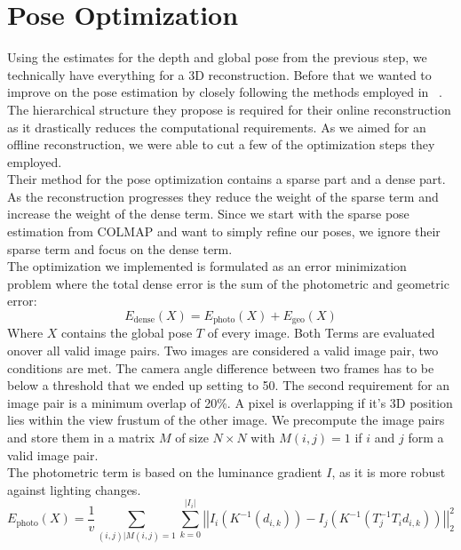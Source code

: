     \section{Pose Optimization}
        Using the estimates for the depth and global pose from the previous step, we technically have everything for a 3D reconstruction.
        Before that we wanted to improve on the pose estimation by closely following the methods employed in ~\cite{dai2017bundlefusion}.
        The hierarchical structure they propose is required for their online reconstruction as it drastically reduces the computational requirements.
        As we aimed for an offline reconstruction, we were able to cut a few of the optimization steps they employed.\\
        Their method for the pose optimization contains a sparse part and a dense part.
        As the reconstruction progresses they reduce the weight of the sparse term and increase the weight of the dense term.
        Since we start with the sparse pose estimation from COLMAP and want to simply refine our poses, we ignore their sparse term and focus on the dense term.\\
        The optimization we implemented is formulated as an error minimization problem where the total dense error is the sum of the photometric and geometric error:
        \begin{equation}
            E_{\text{dense}}(X) = E_{\text{photo}}(X) + E_{\text{geo}}(X)
        \end{equation}
        Where $X$ contains the global pose $T$ of every image.
        Both Terms are evaluated onover all valid image pairs.
        Two images are considered a valid image pair, two conditions are met.
        The camera angle difference between two frames has to be below a threshold that we ended up setting to 50\textdegree.
        The second requirement for an image pair is a minimum overlap of 20\%.
        A pixel is overlapping if it's 3D position lies within the view frustum of the other image.
        We precompute the image pairs and store them in a matrix $M$ of size $N \times N$ with $M(i,j) = 1$ if $i$ and $j$ form a valid image pair.\\
        The photometric term is based on the luminance gradient $I$, as it is more robust against lighting changes.
        \begin{equation}
            E_{\text{photo}}(X) =
            \frac{1}{v} \sum_{(i,j) | M(i,j)=1}\sum_{k=0}^{\left\lvert I_i \right\rvert}
            \left\lvert\left\lvert
            I_i(K^{-1}(d_{i,k})) - I_j(K^{-1}(T_j^{-1}T_id_{i,k}))
            \right\rvert\right\rvert_2^2
            \label{eq:ephoto}
        \end{equation}
